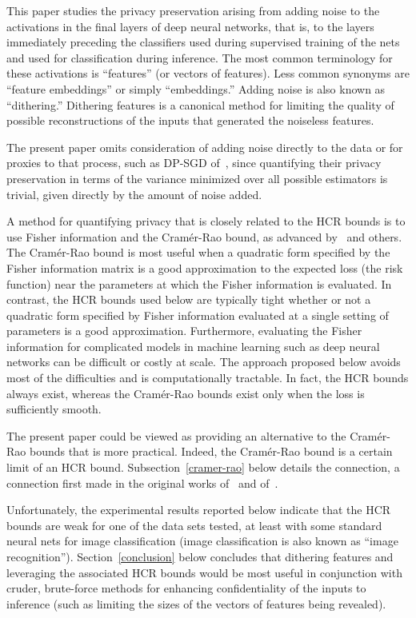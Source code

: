 \documentclass[]{fairmeta}
\begin{document}
This paper studies the privacy preservation arising from adding noise
to the activations in the final layers of deep neural networks,
that is, to the layers immediately preceding the classifiers used during
supervised training of the nets and used for classification during inference.
The most common terminology for these activations is ``features'' (or vectors
of features). Less common synonyms are ``feature embeddings''
or simply ``embeddings.'' Adding noise is also known as ``dithering.''
Dithering features is a canonical method for limiting the quality
of possible reconstructions of the inputs
that generated the noiseless features.

The present paper omits consideration of adding noise directly to the data
or for proxies to that process, such as DP-SGD of~\cite{dp-sgd},
since quantifying their privacy preservation in terms
of the variance minimized over all possible estimators is trivial,
given directly by the amount of noise added.

A method for quantifying privacy that is closely related to the HCR bounds
is to use Fisher information and the Cram\'er-Rao bound,
as advanced by~\cite{hannun-guo-van-der-maaten} and others.
The Cram\'er-Rao bound is most useful
when a quadratic form specified by the Fisher information matrix
is a good approximation to the expected loss (the risk function)
near the parameters at which the Fisher information is evaluated.
In contrast, the HCR bounds used below are typically tight
whether or not a quadratic form specified by Fisher information
evaluated at a single setting of parameters is a good approximation.
Furthermore, evaluating the Fisher information for complicated models
in machine learning such as deep neural networks can be difficult
or costly at scale. The approach proposed below avoids most of the difficulties
and is computationally tractable. In fact, the HCR bounds always exist, whereas
the Cram\'er-Rao bounds exist only when the loss is sufficiently smooth.

The present paper could be viewed as providing an alternative
to the Cram\'er-Rao bounds that is more practical.
Indeed, the Cram\'er-Rao bound is a certain limit of an HCR bound.
Subsection~\ref{cramer-rao} below details the connection,
a connection first made in the original works
of~\cite{hammersley} and of~\cite{chapman-robbins}.

Unfortunately, the experimental results reported below indicate that
the HCR bounds are weak for one of the data sets tested,
at least with some standard neural nets for image classification
(image classification is also known as ``image recognition'').
Section~\ref{conclusion} below concludes that dithering features
and leveraging the associated HCR bounds would be most useful
in conjunction with cruder, brute-force methods for enhancing confidentiality
of the inputs to inference (such as limiting the sizes
of the vectors of features being revealed).
\end{document}
